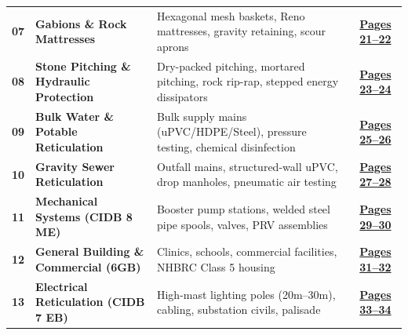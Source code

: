 \documentclass[a4paper,11pt]{article}
\begin{document}
\begin{tabularx}{\textwidth}{@{}l p{4.2cm} X c@{}}
\rowcolor{mhbluelight}
\fontsize{7.5pt}{9.0pt}\selectfont\bfseries 07 & \fontsize{7.5pt}{9.0pt}\selectfont\bfseries Gabions \& Rock Mattresses & \fontsize{7.5pt}{9.0pt}\selectfont Hexagonal mesh baskets, Reno mattresses, gravity retaining, scour aprons & \fontsize{7.5pt}{9.0pt}\selectfont\hyperlink{sec:gabions}{\bfseries\color{mhblue}Pages 21--22} \\
\fontsize{7.5pt}{9.0pt}\selectfont\bfseries 08 & \fontsize{7.5pt}{9.0pt}\selectfont\bfseries Stone Pitching \& Hydraulic Protection & \fontsize{7.5pt}{9.0pt}\selectfont Dry-packed pitching, mortared pitching, rock rip-rap, stepped energy dissipators & \fontsize{7.5pt}{9.0pt}\selectfont\hyperlink{sec:pitching}{\bfseries\color{mhblue}Pages 23--24} \\
\rowcolor{mhbluelight}
\fontsize{7.5pt}{9.0pt}\selectfont\bfseries 09 & \fontsize{7.5pt}{9.0pt}\selectfont\bfseries Bulk Water \& Potable Reticulation & \fontsize{7.5pt}{9.0pt}\selectfont Bulk supply mains (uPVC/HDPE/Steel), pressure testing, chemical disinfection & \fontsize{7.5pt}{9.0pt}\selectfont\hyperlink{sec:waterretic}{\bfseries\color{mhblue}Pages 25--26} \\
\fontsize{7.5pt}{9.0pt}\selectfont\bfseries 10 & \fontsize{7.5pt}{9.0pt}\selectfont\bfseries Gravity Sewer Reticulation & \fontsize{7.5pt}{9.0pt}\selectfont Outfall mains, structured-wall uPVC, drop manholes, pneumatic air testing & \fontsize{7.5pt}{9.0pt}\selectfont\hyperlink{sec:sewer}{\bfseries\color{mhblue}Pages 27--28} \\
\rowcolor{mhbluelight}
\fontsize{7.5pt}{9.0pt}\selectfont\bfseries 11 & \fontsize{7.5pt}{9.0pt}\selectfont\bfseries Mechanical Systems (CIDB 8 ME) & \fontsize{7.5pt}{9.0pt}\selectfont Booster pump stations, welded steel pipe spools, valves, PRV assemblies & \fontsize{7.5pt}{9.0pt}\selectfont\hyperlink{sec:mechanical}{\bfseries\color{mhblue}Pages 29--30} \\
\fontsize{7.5pt}{9.0pt}\selectfont\bfseries 12 & \fontsize{7.5pt}{9.0pt}\selectfont\bfseries General Building \& Commercial (6GB) & \fontsize{7.5pt}{9.0pt}\selectfont Clinics, schools, commercial facilities, NHBRC Class 5 housing & \fontsize{7.5pt}{9.0pt}\selectfont\hyperlink{sec:building}{\bfseries\color{mhblue}Pages 31--32} \\
\rowcolor{mhbluelight}
\fontsize{7.5pt}{9.0pt}\selectfont\bfseries 13 & \fontsize{7.5pt}{9.0pt}\selectfont\bfseries Electrical Reticulation (CIDB 7 EB) & \fontsize{7.5pt}{9.0pt}\selectfont High-mast lighting poles (20m--30m), cabling, substation civils, palisade & \fontsize{7.5pt}{9.0pt}\selectfont\hyperlink{sec:electrical}{\bfseries\color{mhblue}Pages 33--34} \\
\end{tabularx}
\renewcommand{\arraystretch}{1}
\end{document}
